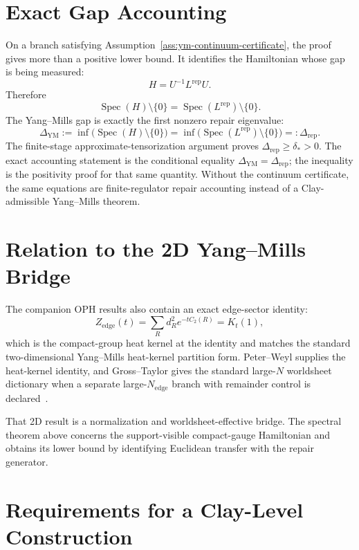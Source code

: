 \documentclass[11pt]{article}
\numberwithin{equation}{section}
\theoremstyle{remark}
\newcommand{\YM}{\mathrm{YM}}
\begin{document}
\section{Exact Gap Accounting}

On a branch satisfying Assumption~\ref{ass:ym-continuum-certificate}, the proof gives more than a
positive lower bound. It identifies the Hamiltonian whose gap is being measured:
\[
H=U^{-1}L^{\mathrm{rep}}U.
\]
Therefore
\[
\operatorname{Spec}(H)\setminus\{0\}
=
\operatorname{Spec}(L^{\mathrm{rep}})\setminus\{0\}.
\]
The Yang--Mills gap is exactly the first nonzero repair eigenvalue:
\[
\Delta_{\YM}
:=
\inf\bigl(\operatorname{Spec}(H)\setminus\{0\}\bigr)
=
\inf\bigl(\operatorname{Spec}(L^{\mathrm{rep}})\setminus\{0\}\bigr)
=:
\Delta_{\mathrm{rep}}.
\]
The finite-stage approximate-tensorization argument proves \(\Delta_{\mathrm{rep}}\ge\delta_*>0\). The exact accounting
statement is the conditional equality \(\Delta_{\YM}=\Delta_{\mathrm{rep}}\); the inequality is the
positivity proof for that same quantity. Without the continuum certificate, the same equations
are finite-regulator repair accounting instead of a Clay-admissible Yang--Mills theorem.

\section{Relation to the 2D Yang--Mills Bridge}
\label{sec:twod-bridge}

The companion OPH results also contain an exact edge-sector identity:
\[
Z_{\mathrm{edge}}(t)=\sum_R d_R^2e^{-tC_2(R)}=K_t(1),
\]
which is the compact-group heat kernel at the identity and matches the standard
two-dimensional Yang--Mills heat-kernel partition form. Peter--Weyl supplies the heat-kernel
identity, and Gross--Taylor gives the standard large-\(N\) worldsheet dictionary when a separate
large-\(N_{\mathrm{edge}}\) branch with remainder control is declared~\cite{peter-weyl,gross-taylor}.

That 2D result is a normalization and worldsheet-effective bridge. The spectral theorem above
concerns the support-visible compact-gauge Hamiltonian and obtains its lower bound by identifying
Euclidean transfer with the repair generator.

\section{Requirements for a Clay-Level Construction}
\end{document}
